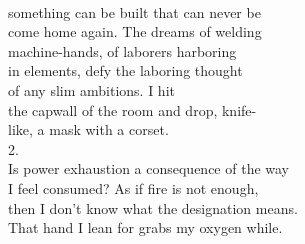 \documentclass[smalldemyvopaper,11pt,twoside,onecolumn,openright,extrafontsizes]{memoir}
\newlength\drop
\begin{document}
\\something can be built that can never be
\\come home again. The dreams of welding
\\machine-hands, of laborers harboring
\\in elements, defy the laboring thought
\\of any slim ambitions. I hit
\\the capwall of the room and drop, knife-
\\like, a mask with a corset.
\\2.
\\Is power exhaustion a consequence of the way
\\I feel consumed? As if fire is not enough,
\\then I don't know what the designation means.
\\That hand I lean for grabs my oxygen while.
\end{document}
